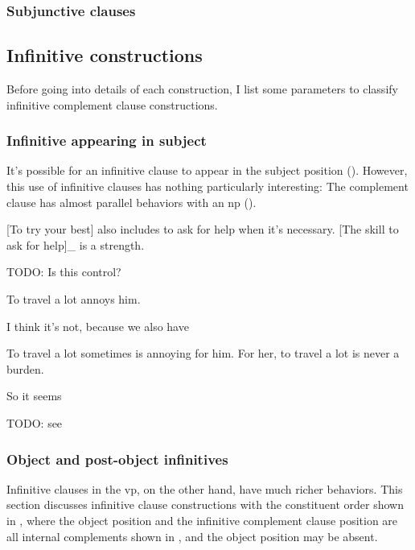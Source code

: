 \documentclass[UTF8, a4paper, oneside, scheme=plain]{ctexrep}
\newcommand*{\citepage}[1]{p.~{#1}}
\begin{document}
\subsubsection{Subjunctive clauses}\label{sec:complement.subjunctive}

\subsection{Infinitive constructions}

Before going into details of each construction,
I list some parameters to classify infinitive complement clause constructions.

\subsubsection{Infinitive appearing in subject}

It's possible for an infinitive clause to appear in the subject position
().
However, this use of infinitive clauses 
has nothing particularly interesting:
The complement clause has almost parallel behaviors with an \acs{np} 
().

\begin{exe}
    \ex\label{ex:complement.infinitive.1} 
    [To try your best] also includes to ask for help when it's necessary.
    \ex\label{ex:complement.infinitive.1p} [The skill to ask for help]_{}
    is a strength.
\end{exe}

TODO: Is this control?
\begin{exe}
    \ex To travel a lot annoys him.
\end{exe}
I think it's not, because we also have 
\begin{exe}
    \ex To travel a lot sometimes is annoying for him.
    \ex For her, to travel a lot is never a burden.
\end{exe}
So it seems 

TODO: see \citet[\citepage{1269}]{cgel}

\subsubsection{Object and post-object infinitives}

Infinitive clauses in the \acs{vp},
on the other hand, 
have much richer behaviors.
This section discusses infinitive clause constructions with the constituent order 
shown in ,
where the object position and the infinitive complement clause position 
are all internal complements shown in ,
and the object position may be absent.
\end{document}
